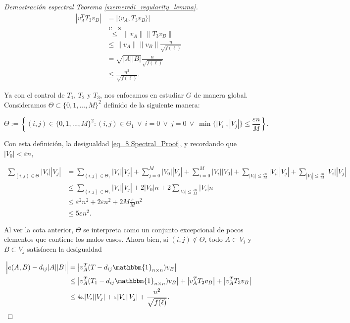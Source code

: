 \documentclass{article}[14pts]
\providecommand{\norm}[1]{\lVert#1\rVert}
\providecommand{\norm}[1]{\lVert#1\rVert}
\let\varepsilon=\varepsilon
\begin{document}
\begin{proof}[Demostración espectral Teorema \ref{szemeredi_regularity_lemma}]
    \begin{align} \label{eq_10 Spectral_Proof}
        \left| v_{A}^{T} T_3 v_B\right| &= \left| \langle v_A, T_3 v_B \rangle \right| \nonumber\\
        &\overset{\mathrm{C-S}}{\leq} \norm{v_A} \norm{T_3 v_B} \nonumber\\
        &\leq \norm{v_A} \norm{v_B} \frac{n}{\sqrt{f(\ell)}} \\
        &= \sqrt{|A| |B|} \frac{n}{\sqrt{f(\ell)}} \nonumber\\
        &\leq \frac{n^{2}}{\sqrt{f(\ell)}}.\nonumber
    \end{align}\medskip

    Ya con el control de $T_1$, $T_2$ y $T_3$, nos enfocamos en estudiar $G$ de manera global. Consideramos $\Theta \subset \lbrace 0,1,...,M\rbrace^{2}$ definido de la siguiente manera:\medskip

    \begin{equation*}
        \Theta := \left\lbrace (i,j)\in \lbrace 0,1,...,M\rbrace^{2} : (i,j)\in \Theta_1\  \vee\  i = 0\  \vee\  j = 0\  \vee\  \min\lbrace |V_i|, |V_j|\rbrace\leq \frac{\varepsilon n}{M}\right\rbrace.
    \end{equation*}\medskip

    Con esta definición, la desigualdad \eqref{eq_8 Spectral_Proof}, y recordando que $|V_0| < \varepsilon n$,\medskip

    \begin{align*}
        \sum_{(i,j)\in \Theta} |V_i| |V_j| &= \sum_{(i,j)\in \Theta_1} |V_i| |V_j| + \sum_{j=0}^{M} |V_0| |V_j| + \sum_{i=0}^{M} |V_i| |V_0| + \sum_{|V_i| \leq \frac{\varepsilon n}{M}} |V_i| |V_j| + \sum_{|V_j|\leq \frac{\varepsilon n}{M}} |V_i| |V_j| \\
        &\leq \sum_{(i,j)\in \Theta_1} |V_i| |V_j| + 2|V_0|n + 2\sum_{|V_i|\leq \frac{\varepsilon n}{M}} |V_i| n \\
        &\leq \varepsilon^{2} n^{2} + 2\varepsilon n^{2} + 2M\frac{\varepsilon}{M} n^{2}\\
        &\leq 5\varepsilon n^{2}.
    \end{align*}\medskip

    Al ver la cota anterior, $\Theta$ se interpreta como un conjunto excepcional de pocos elementos que contiene los malos casos. Ahora bien, si $(i,j)\not\in \Theta$, todo $A\subset V_i$ y $B\subset V_j$ satisfacen la desigualdad\medskip

    \begin{align} \label{eq_11 Spectral_Proof}
        \Big| e(A,B) - d_{ij}|A||B|\Big| &= \left| v_{A}^{T}(T - d_{ij}\mathbbm{1}_{n\times n}) v_B \right|\nonumber\\
        &\leq \left| v_{A}^{T} (T_1 -d_{ij}\mathbbm{1}_{n\times n}) v_B\right| + \left| v_{A}^{T} T_2 v_B\right| + \left| v_{A}^{T} T_3 v_B\right|\nonumber\\
        &\leq 4\varepsilon |V_i| |V_j| + \varepsilon |V_i| |V_j| + \frac{n^{2}}{\sqrt{f(\ell)}}.
    \end{align}\medskip


\end{proof}
\end{document}
